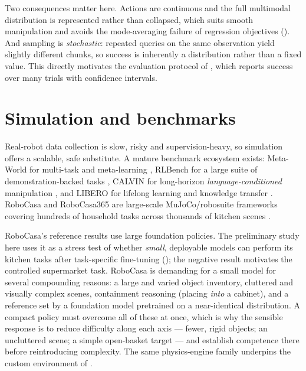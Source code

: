 Two consequences matter here. Actions are continuous and the full multimodal
distribution is represented rather than collapsed, which suits smooth manipulation and
avoids the mode-averaging failure of regression objectives (). And
sampling is \emph{stochastic}: repeated queries on the same observation yield slightly
different chunks, so success is inherently a distribution rather than a fixed value.
This directly motivates the evaluation protocol of , which
reports success over many trials with confidence intervals.

\section{Simulation and benchmarks}
\label{sec:bg-sim}
Real-robot data collection is slow, risky and supervision-heavy, so simulation offers a
scalable, safe substitute. A mature benchmark ecosystem exists: Meta-World for
multi-task and meta-learning \parencite{yu2019metaworld}, RLBench for a large suite of
demonstration-backed tasks \parencite{james2020rlbench}, CALVIN for long-horizon
\emph{language-conditioned} manipulation \parencite{mees2022calvin}, and LIBERO for
lifelong learning and knowledge transfer \parencite{liu2023libero}. RoboCasa and
RoboCasa365 are large-scale MuJoCo/robosuite frameworks covering hundreds of household
tasks across thousands of kitchen scenes \parencite{nasiriany2024robocasa,
nasiriany2026robocasa365}.

RoboCasa's reference results use large foundation policies. The preliminary study here
uses it as a stress test of whether \emph{small}, deployable models can perform its
kitchen tasks after task-specific fine-tuning (); the
negative result motivates the controlled supermarket task. RoboCasa is demanding for a
small model for several compounding reasons: a large and varied object inventory,
cluttered and visually complex scenes, containment reasoning (placing \emph{into} a
cabinet), and a reference set by a foundation model pretrained on a near-identical
distribution. A compact policy must overcome all of these at once, which is why the
sensible response is to reduce difficulty along each axis --- fewer, rigid objects; an
uncluttered scene; a simple open-basket target --- and establish competence there
before reintroducing complexity. The same physics-engine family underpins the custom
environment of  \parencite{todorov2012mujoco, zhu2020robosuite}.

